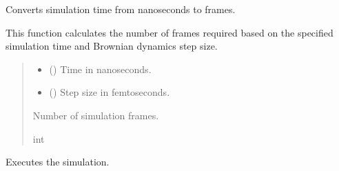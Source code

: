 \documentclass[letterpaper,10pt,english]{sphinxmanual}
\begin{document}
\begin{fulllineitems}
\begin{fulllineitems}
\begin{quote}
\begin{description}
\end{description}\end{quote}

\end{fulllineitems}


\begin{fulllineitems}
\label{\detokenize{src:src.Simulation_Class.Simulation.convert_time_ns_to_frames}}
\pysigstartsignatures
{}
\pysigstopsignatures
\sphinxAtStartPar
Converts simulation time from nanoseconds to frames.

\sphinxAtStartPar
This function calculates the number of frames required based on the
specified simulation time and Brownian dynamics step size.
\begin{quote}\begin{description}
\begin{itemize}
\item {} 
\sphinxAtStartPar
{} () \textendash{} Time in nanoseconds.

\item {} 
\sphinxAtStartPar
{} () \textendash{} Step size in femtoseconds.

\end{itemize}

\sphinxAtStartPar
Number of simulation frames.

\sphinxAtStartPar
int

\end{description}\end{quote}

\end{fulllineitems}


\begin{fulllineitems}
\label{\detokenize{src:src.Simulation_Class.Simulation.run}}
\pysigstartsignatures
{}
\pysigstopsignatures
\sphinxAtStartPar
Executes the simulation.


\end{fulllineitems}
\end{fulllineitems}
\end{document}
